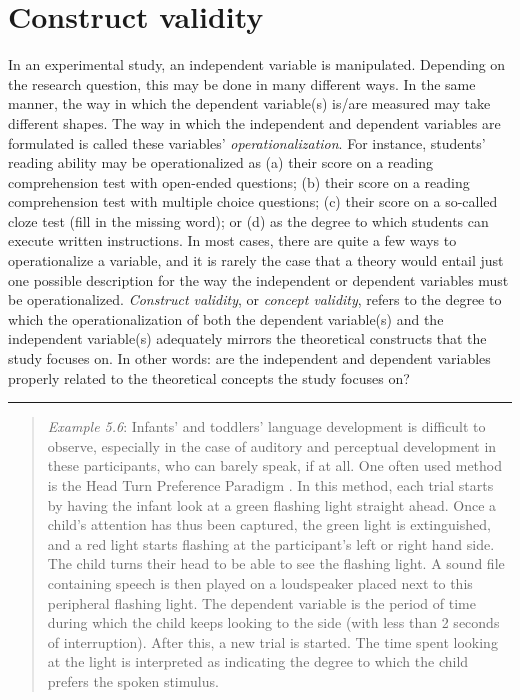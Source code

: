 \documentclass[
]{book}
\begin{document}
\section{Construct validity}\label{sec:constructvalidity}

In an experimental study, an independent variable is manipulated. Depending on the research question, this may be done in many different ways. In the same manner, the way in which the dependent variable(s) is/are measured may take different shapes. The way in which the independent and dependent variables are formulated is called these variables' \emph{operationalization}. For instance, students' reading ability may be operationalized as (a) their score on a reading comprehension test with open-ended questions; (b) their score on a reading comprehension test with multiple choice questions; (c) their score on a so-called cloze test (fill in the missing word); or (d) as the degree to which students can execute written instructions. In most cases, there are quite a few ways to operationalize a variable, and it is rarely the case that a theory would entail just one possible description for the way the independent or dependent variables must be operationalized. \emph{Construct validity}, or \emph{concept validity}, refers to the degree to which the operationalization of both the dependent variable(s) and the independent variable(s) adequately mirrors the theoretical constructs that the study focuses on. In other words: are the independent and dependent variables properly related to the theoretical concepts the study focuses on?

\begin{center}\rule{0.5\linewidth}{0.5pt}\end{center}

\begin{quote}
\emph{Example 5.6}: Infants' and toddlers' language development is difficult to observe, especially in the case of auditory and perceptual development in these participants, who can barely speak, if at all. One often used method is the Head Turn Preference Paradigm \citep{John10}. In this method, each trial starts by having the infant look at a green flashing light straight ahead. Once a child's attention has thus been captured, the green light is extinguished, and a red light starts flashing at the participant's left or right hand side. The child turns their head to be able to see the flashing light. A sound file containing speech is then played on a loudspeaker placed next to this peripheral flashing light. The dependent variable is the period of time during which the child keeps looking to the side (with less than 2 seconds of interruption). After this, a new trial is started. The time spent looking at the light is interpreted as indicating the degree to which the child prefers the spoken stimulus.
\end{quote}
\end{document}
